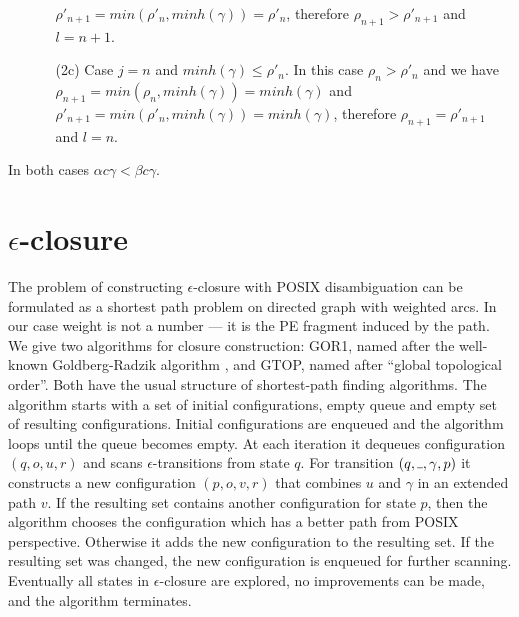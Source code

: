 \documentclass[AMA,STIX1COL]{WileyNJD-v2}
\newcommand{\Xund}{\rule{.4em}{.4pt}}
\begin{document}
\begin{proofEnd}
\begin{itemize}[itemsep=0.5em, topsep=0.5em]
\begin{itemize}
            $\rho'_{n+1} = min(\rho'_n, minh(\gamma)) = \rho'_n$,
            therefore $\rho_{n+1} > \rho'_{n+1}$
            and $l = n + 1$.
        \item[(2c)]
            Case $j = n$ and $minh(\gamma) \leq \rho'_n$.
            In this case $\rho_n > \rho'_n$ and we have
            $\rho_{n+1} = min(\rho_n, minh(\gamma)) = minh(\gamma)$ and
            $\rho'_{n+1} = min(\rho'_n, minh(\gamma)) = minh(\gamma)$,
            therefore $\rho_{n+1} = \rho'_{n+1}$
            and $l = n$.
        \end{itemize}
    \end{itemize}
    In both cases $\alpha c \gamma < \beta c \gamma$.
\end{proofEnd}


\section{$\epsilon$-closure}\label{section_closure}

The problem of constructing $\epsilon$-closure with POSIX disambiguation
can be formulated as a shortest path problem on directed graph with weighted arcs.
In our case weight is not a number --- it is the PE fragment induced by the path.
%
We give two algorithms for closure construction: GOR1, named after the well-known Goldberg-Radzik algorithm \cite{GR93},
and GTOP, named after ``global topological order''.
%
Both have the usual structure of shortest-path finding algorithms.
The algorithm starts with a set of initial configurations, empty queue and empty set of resulting configurations.
Initial configurations are enqueued and the algorithm loops until the queue becomes empty.
At each iteration it dequeues configuration $(q, o, u, r)$ and scans $\epsilon$-transitions from state $q$.
For transition $(q, \Xund, \gamma, p)$ it constructs a new configuration $(p, o, v, r)$
that combines $u$ and $\gamma$ in an extended path $v$.
If the resulting set contains another configuration for state $p$,
then the algorithm chooses the configuration which has a better path from POSIX perspective.
Otherwise it adds the new configuration to the resulting set.
If the resulting set was changed, the new configuration is enqueued for further scanning.
Eventually all states in $\epsilon$-closure are explored, no improvements can be made, and the algorithm terminates.
%
\\
\end{document}
